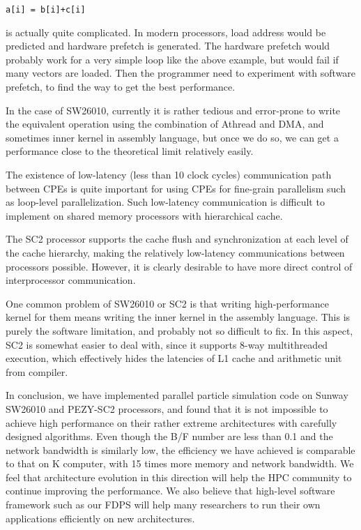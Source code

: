 \documentclass[Afour,sageh,times]{sagej}
\begin{document}
{\tt a[i] =   b[i]+c[i]}

is actually quite complicated. In modern processors, load address
would be predicted and hardware prefetch is generated. The hardware
prefetch would probably work for a very simple loop like the above
example, but would fail if many vectors are loaded. Then the
programmer need to experiment with software prefetch, to find the way
to get the best performance.

In the case of SW26010, currently it is rather tedious and error-prone
to write the equivalent operation using the combination of Athread and
DMA, and sometimes inner kernel in assembly language, but once we do
so, we can get a performance close to the theoretical limit relatively
easily.

The existence of low-latency (less than 10 clock cycles) communication
path between CPEs is quite important for using CPEs for fine-grain
parallelism such as loop-level parallelization. Such low-latency
communication is difficult to implement on shared memory processors
with hierarchical cache.

The SC2 processor supports the cache flush and synchronization at each
level of the cache hierarchy, making the relatively low-latency
communications between processors possible.  However, it is clearly
desirable to have more direct control of interprocessor communication.

One common problem of SW26010 or SC2 is that writing high-performance
kernel for them means writing the inner kernel in the assembly
language. This is purely the software limitation, and probably not so
difficult to fix. In this aspect, SC2 is somewhat easier to deal with,
since it supports 8-way multithreaded execution, which effectively
hides the latencies of L1 cache and arithmetic unit from compiler.

In conclusion, we have implemented parallel particle simulation code
on Sunway SW26010 and PEZY-SC2 processors, and found that it is not
impossible to achieve high performance on their rather extreme
architectures with carefully designed algorithms. Even though the B/F
number are less than 0.1 and the network bandwidth is similarly low,
the efficiency we have achieved is comparable to that on K computer,
with 15 times more memory and network bandwidth. We feel that
architecture evolution in this direction will help the HPC community
to continue improving the performance. We also believe that high-level
software framework such as our FDPS will help many researchers to run
their own applications efficiently on new architectures.
\end{document}
